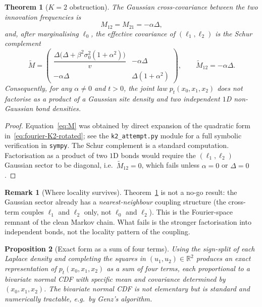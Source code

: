 \documentclass[11pt,a4paper]{article}
\theoremstyle{plainserif}
\newtheorem{theorem}{Theorem}
\newtheorem{proposition}[theorem]{Proposition}
\theoremstyle{definition}
\theoremstyle{remarkstyle}
\newtheorem*{remark}{Remark}
\newcommand{\R}{\mathbb{R}}
\begin{document}
\begin{theorem}[$K{=}2$ obstruction]
\label{thm:K2-obstruction}
The Gaussian cross-covariance between the two innovation frequencies
is
\begin{equation}
M_{12} = M_{21} = -\alpha\Delta,
\label{eq:K2-cross}
\end{equation}
and, after marginalising $\ell_0$, the effective covariance of
$(\ell_1,\ell_2)$ is the Schur complement
\begin{equation}
\widetilde M = \begin{pmatrix}
\dfrac{\Delta\bigl(\Delta + \beta^2\sigma_0^2(1+\alpha^2)\bigr)}{v}
& -\alpha\Delta \\[6pt]
-\alpha\Delta & \Delta(1+\alpha^2)
\end{pmatrix},\qquad
\widetilde M_{12} = -\alpha\Delta.
\end{equation}
Consequently, for any $\alpha\neq 0$ and $t>0$, the joint law
$p_t(x_0,x_1,x_2)$ does \emph{not} factorise as a product of a
Gaussian site density and two independent $1$D non-Gaussian bond
densities.
\end{theorem}

\begin{proof}
Equation~\eqref{eq:M} was obtained by direct expansion of the quadratic
form in~\eqref{eq:fourier-K2-rotated}; see the
\texttt{k2\_attempt.py} module for a full symbolic verification in
\texttt{sympy}. The Schur complement is a standard computation.
Factorisation as a product of two $1$D bonds would require the
$(\ell_1,\ell_2)$ Gaussian sector to be diagonal, i.e.\ $\widetilde M_{12}=0$,
which fails unless $\alpha=0$ or $\Delta=0$.
\end{proof}

\begin{remark}[Where locality survives]
Theorem~\ref{thm:K2-obstruction} is not a no-go result: the Gaussian
sector already has a \emph{nearest-neighbour} coupling structure (the
cross-term couples $\ell_1$ and $\ell_2$ only, not $\ell_0$ and $\ell_2$).
This is the Fourier-space remnant of the clean Markov chain. What
fails is the stronger factorisation into independent bonds, not the
locality pattern of the coupling.
\end{remark}

\begin{proposition}[Exact form as a sum of four terms]
\label{prop:K2-four-terms}
Using the sign-split of each Laplace density and completing the squares
in $(u_1,u_2)\in\R^2$ produces an exact representation of $p_t(x_0,x_1,x_2)$
as a sum of four terms, each proportional to a bivariate normal CDF
with specific mean and covariance determined by $(x_0,x_1,x_2)$. The
bivariate normal CDF is not elementary but is standard and numerically
tractable, e.g.\ by Genz's algorithm.
\end{proposition}
\end{document}
